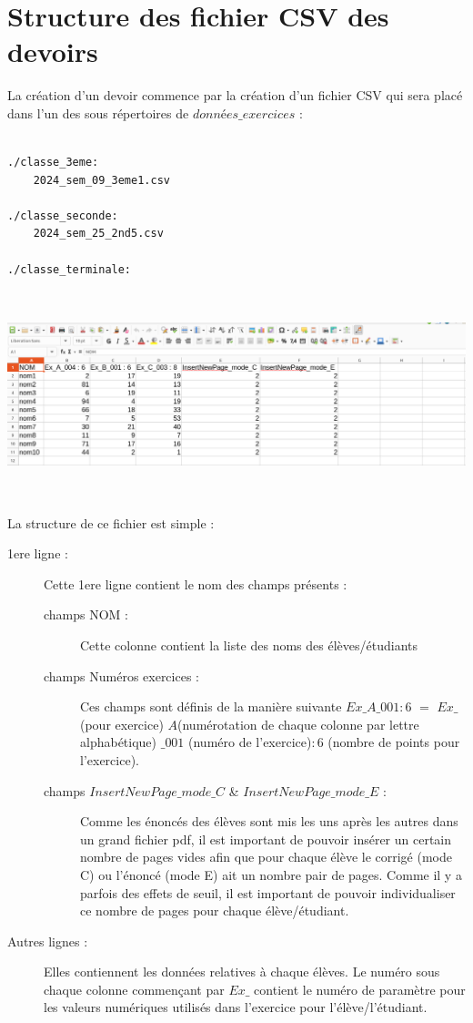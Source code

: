 \section{Structure des fichier CSV des devoirs}

La création d'un devoir commence par la création d'un fichier CSV qui sera placé dans l'un des sous répertoires de $données\_exercices$ :

\begin{verbatim}
 
./classe_3eme:
    2024_sem_09_3eme1.csv

./classe_seconde:
    2024_sem_25_2nd5.csv

./classe_terminale:
\end{verbatim}


 \includegraphics[width=15cm,height=6cm]{./images/creation_devoir_01.png}

La structure de ce fichier est simple : 

\begin{description}
 \item[1ere ligne : ] Cette 1ere ligne contient le nom des champs présents :
 \begin{description}
  \item[champs NOM : ] Cette colonne contient la liste des noms des élèves/étudiants
  \item[champs Numéros exercices : ] Ces champs sont définis de la manière suivante $Ex\_A\_001 : 6$ $=$ $Ex\_$(pour exercice) 
      $A$(numérotation de chaque colonne par lettre alphabétique) $ \_001$ (numéro de l'exercice)$ : 6$ (nombre de points pour l'exercice).
  \item[champs $InsertNewPage\_mode\_C$ \& $InsertNewPage\_mode\_E$ : ] Comme les énoncés des élèves sont mis les uns après les autres dans un grand fichier pdf, il est important de pouvoir  insérer un certain nombre de pages vides afin que pour chaque élève le corrigé (mode C) ou l'énoncé (mode E) ait un nombre pair de pages. 
Comme il y a parfois des effets de seuil, il est important de pouvoir individualiser ce nombre de pages pour chaque élève/étudiant. 
\end{description}
\item[Autres lignes : ] Elles contiennent les données relatives à chaque élèves. Le numéro sous chaque colonne commençant par $Ex\_$ contient le numéro de paramètre pour les valeurs numériques utilisés dans l'exercice pour l'élève/l'étudiant. 
\end{description}



